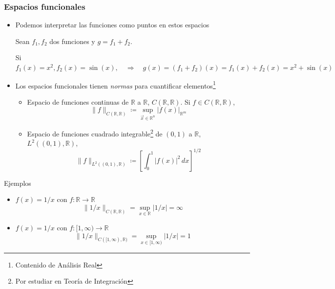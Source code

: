 \documentclass[12pt,aspectratio=169,xcolor=dvipsnames]{beamer}
\newcommand{\R}{\mathbb{R}}
\begin{document}
\begin{frame}[t]\frametitle{Espacios funcionales}
    \begin{footnotesize}
    \begin{itemize}
        \item<+-> Podemos interpretar las funciones como puntos en estos espacios
            \begin{exampleblock}{}
                Sean $f_1, f_2$ dos funciones y $g = f_1 + f_2$. 

                Si $f_1(x) = x^2, f_2(x) = \sin(x), \quad\Rightarrow\quad g(x) = (f_1+f_2)(x) = f_1(x)+f_2(x) = x^2+\sin(x)$
            \end{exampleblock}
        \item<+-> Los espacios funcionales tienen \emph{normas} para cuantificar elementos\footnote{Contenido de Análisis Real}
            \begin{itemize}
                \item<+-> Espacio de funciones continuas de $\R$ a $\R$, $C(\R, \R)$. Si $f\in C(\R, \R)$, 
                    $$ \| f \|_{C(\R, \R)} \coloneqq \sup_{\vec x\in  \R^n}|f(x)|_{\R^m} $$
                \item<+-> Espacio de funciones cuadrado integrable\footnote{Por estudiar en Teoría de Integración} de $(0,1)$ a $\R$, $L^2((0,1), \R)$,
                    $$ \| f \|_{L^2((0,1), \R)} \coloneqq \left[ \int_0^1|f(x)|^2\,dx \right]^{1/2} $$
            \end{itemize}
    \end{itemize}
    \end{footnotesize}
\end{frame}
\begin{frame}{Ejemplos}
    \begin{itemize}
        \item<+-> $f(x) = 1/x$ con $f:\R \to \R$
            $$ \| 1/x \|_{C(\R, \R)} =\sup_{x\in \R} |1/x| = \infty$$
        \item<+-> $f(x) = 1/x$ con $f:[1,\infty) \to \R$
            $$\|1/x\|_{C([1,\infty),\R)} = \sup_{x\in [1,\infty)}|1/x| = 1 $$
    \end{itemize}



\end{frame}
\end{document}

